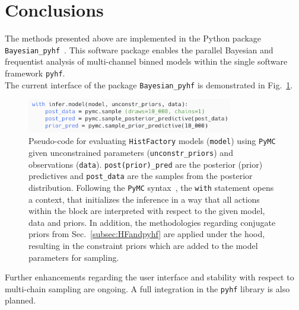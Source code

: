 \section{Conclusions}\label{sec:conclusions}

The methods presented above are implemented in the Python package \texttt{Bayesian\_pyhf}~\cite{BayesianPyhf}. This software package enables the parallel Bayesian and frequentist analysis of multi-channel binned models within the single software framework \texttt{pyhf}.\\
The current interface of the package \texttt{Bayesian\_pyhf} is demonstrated in Fig.~\ref{code}.
    \begin{figure} %
        \centering
        \includegraphics[width=9cm]{figures/code2.png}
        \centering
        \caption{Pseudo-code for evaluating \texttt{HistFactory} models (\texttt{model}) using \texttt{PyMC} given unconstrained parameters (\texttt{unconstr\_priors}) and observations (\texttt{data}). \texttt{post(prior)\_pred} are the posterior (prior) predictives and \texttt{post\_data} are the samples from the posterior distribution. Following the \texttt{PyMC} syntax~\cite{PyMC}, the \texttt{with} statement opens a context, that initializes the inference in a way that all actions within the block are interpreted with respect to the given model, data and priors. In addition, the methodologies regarding conjugate priors from Sec.~\ref{subsec:HFandpyhf} are applied under the hood, resulting in the constraint priors which are added to the model parameters for sampling.}
        \label{code}
    \end{figure}
\noindent Further enhancements regarding the user interface and stability with respect to multi-chain sampling are ongoing. A full integration in the \texttt{pyhf} library is also planned.
